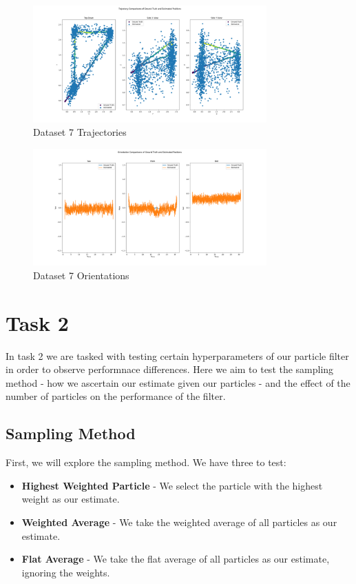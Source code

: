\documentclass{article}
\begin{document}
\begin{figure}[H]
    \centering
    \includegraphics[width=0.8\textwidth]{./imgs/task1/studentdata7_positions.png}
    \caption{Dataset 7 Trajectories}
\end{figure}

\begin{figure}[H]
    \centering
    \includegraphics[width=0.8\textwidth]{./imgs/task1/studentdata7_orientations.png}
    \caption{Dataset 7 Orientations}
\end{figure}

\section*{Task 2}

In task 2 we are tasked with testing certain hyperparameters of our particle filter in order to observe performnace differences. Here we aim to test the sampling method - how we ascertain our estimate given our particles - and the effect of the number of particles on the performance of the filter.

\subsection*{Sampling Method}

First, we will explore the sampling method. We have three to test:

\begin{itemize}
    \item \textbf{Highest Weighted Particle} - We select the particle with the highest weight as our estimate.
    \item \textbf{Weighted Average} - We take the weighted average of all particles as our estimate.
    \item \textbf{Flat Average} - We take the flat average of all particles as our estimate, ignoring the weights.
\end{itemize}
\end{document}
